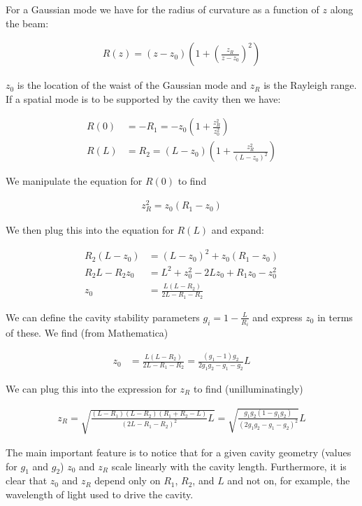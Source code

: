 \documentclass[12pt]{article}
\begin{document}
For a Gaussian mode we have for the radius of curvature as a function of $z$ along the beam:

\begin{align}
R(z) = (z-z_0)\left(1+\left( \frac{z_R}{z-z_0}\right)^2\right)
\end{align}

$z_0$ is the location of the waist of the Gaussian mode and $z_R$ is the Rayleigh range.
If a spatial mode is to be supported by the cavity then we have:


\begin{align}
R(0) &=  -R_1 = -z_0\left(1+\frac{z_R^2}{z_0^2}\right)\\
R(L) &= R_2 = (L-z_0)\left(1+\frac{z_R^2}{(L-z_0)^2}\right)
\end{align}

We manipulate the equation for $R(0)$ to find

\begin{align}
z_R^2 = z_0\left(R_1-z_0\right)
\end{align}

We then plug this into the equation for $R(L)$ and expand:

\begin{align}
R_2(L-z_0) &= (L-z_0)^2 + z_0(R_1-z_0)\\
R_2L - R_2z_0 &= L^2 + z_0^2 - 2Lz_0 + R_1z_0 - z_0^2\\
z_0 &= \frac{L(L-R_2)}{2L-R_1-R_2}
\end{align}

We can define the cavity stability parameters $g_i = 1-\frac{L}{R_i}$ and express $z_0$ in terms of these. We find (from Mathematica)

\begin{align}
z_0 &= \frac{L(L-R_2)}{2L-R_1-R_2} = \frac{(g_1-1)g_2}{2g_1g_2 - g_1 - g_2} L
\end{align}

We can plug this into the expression for $z_R$ to find (unilluminatingly)

\begin{align}
z_R = \sqrt{\frac{(L-R_1)(L-R_2)(R_1+R_2-L)}{(2L-R_1-R_2)^2}L} = \sqrt{\frac{g_1g_2(1-g_1g_2)}{(2g_1g_2 - g_1 - g_2)^2}} L
\end{align}

The main important feature is to notice that for a given cavity geometry (values for $g_1$ and $g_2$) $z_0$ and $z_R$ scale linearly with the cavity length. Furthermore, it is clear that $z_0$ and $z_R$ depend only on $R_1$, $R_2$, and $L$ and not on, for example, the wavelength of light used to drive the cavity.
\end{document}
